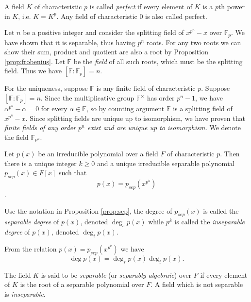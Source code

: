 \documentclass[a4paper]{article}
\begin{document}
\begin{definition}
  A field $K$ of characteristic $p$ is called \emph{perfect} if every element of $K$ is a $p$th power in $K$, i.e. $K = K^p$. Any field of characteristic $0$ is also called perfect.
\end{definition}

\begin{eg}
  Let $n$ be a positive integer and consider the splitting field of $x^{p^n}-x$ over $\mathbb F_p$. We have shown that it is separable, thus having $p^n$ roots. For any two roots we can show their sum, product and quotient are also a root by Proposition \ref{prop:frobenius}. Let $\mathbb F$ be the \emph{field} of all such roots, which must be the splitting field. Thus we have $[\mathbb F:\mathbb F_p] = n$.

  For the uniqueness, suppose $\mathbb F$ is any finite field of characteristic $p$. Suppose $[\mathbb F:\mathbb F_p] = n$. Since the multiplicative group $\mathbb F^\times$ has order $p^n - 1$, we have $\alpha^{p^n}-\alpha=0$ for every $\alpha\in\mathbb F$, so by counting argument $\mathbb F$ is a splitting field of $x^{p^n}-x$. Since splitting fields are unique up to isomorphism, we have proven that \emph{finite fields of any order $p^n$ exist and are unique up to isomorphism.} We denote the field $\mathbb F_{p^n}$.
\end{eg}

\begin{proposition}\label{prop:sep}
  Let $p(x)$ be an irreducible polynomial over a field $F$ of characteristic $p$. Then there is a unique integer $k \geq 0$ and a unique irreducible separable polynomial $p_{sep}(x)\in F[x]$ such that
  \[ p(x) = p_{sep}(x^{p^k}) \].
\end{proposition}

\begin{definition}
  Use the notation in Proposition \ref{prop:sep}, the degree of $p_{sep}(x)$ is called the \emph{separable degree} of $p(x)$, denoted $\deg_s p(x)$ while $p^k$ is called the \emph{inseparable degree} of $p(x)$, denoted $\deg_i p(x)$.
\end{definition}

From the relation $p(x) = p_{sep}(x^{p^k})$ we have
\[ \deg p(x) = \deg_s p(x) \deg_i p(x). \]

\begin{definition}
  The field $K$ is said to be \emph{separable} (or \emph{separably algebraic}) over $F$ if every element of $K$ is the root of a separable polynomial over $F$. A field which is not separable is \emph{inseparable}.
\end{definition}
\end{document}
